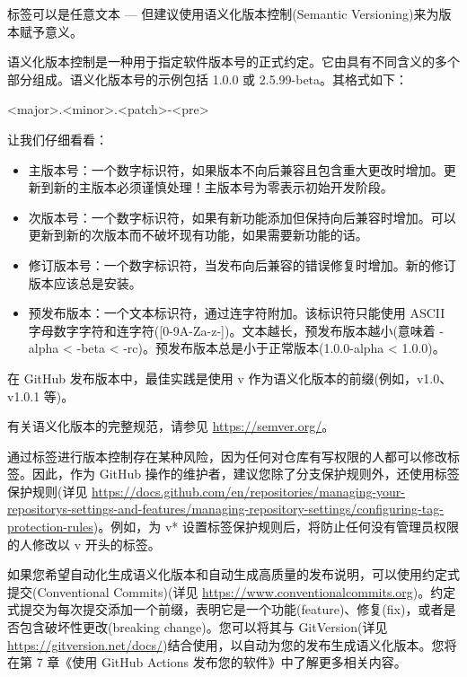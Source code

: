 标签可以是任意文本 --- 但建议使用语义化版本控制(Semantic Versioning)来为版本赋予意义。

语义化版本控制是一种用于指定软件版本号的正式约定。它由具有不同含义的多个部分组成。语义化版本号的示例包括 1.0.0 或 2.5.99-beta。其格式如下：

\begin{shell}
<major>.<minor>.<patch>-<pre>
\end{shell}

让我们仔细看看：

\begin{itemize}
\item 
主版本号：一个数字标识符，如果版本不向后兼容且包含重大更改时增加。更新到新的主版本必须谨慎处理！主版本号为零表示初始开发阶段。

\item 
次版本号：一个数字标识符，如果有新功能添加但保持向后兼容时增加。可以更新到新的次版本而不破坏现有功能，如果需要新功能的话。

\item 
修订版本号：一个数字标识符，当发布向后兼容的错误修复时增加。新的修订版本应该总是安装。

\item 
预发布版本：一个文本标识符，通过连字符附加。该标识符只能使用 ASCII 字母数字字符和连字符([0-9A-Za-z-])。文本越长，预发布版本越小(意味着 -alpha < -beta < -rc)。预发布版本总是小于正常版本(1.0.0-alpha < 1.0.0)。
\end{itemize}


在 GitHub 发布版本中，最佳实践是使用 v 作为语义化版本的前缀(例如，v1.0、v1.0.1 等)。

有关语义化版本的完整规范，请参见 \url{https://semver.org/}。


通过标签进行版本控制存在某种风险，因为任何对仓库有写权限的人都可以修改标签。因此，作为 GitHub 操作的维护者，建议您除了分支保护规则外，还使用标签保护规则(详见 \url{https://docs.github.com/en/repositories/managing-your-repositorys-settings-and-features/managing-repository-settings/configuring-tag-protection-rules})。例如，为 v* 设置标签保护规则后，将防止任何没有管理员权限的人修改以 v 开头的标签。

如果您希望自动化生成语义化版本和自动生成高质量的发布说明，可以使用约定式提交(Conventional Commits)(详见 \url{https://www.conventionalcommits.org})。约定式提交为每次提交添加一个前缀，表明它是一个功能(feature)、修复(fix)，或者是否包含破坏性更改(breaking change)。您可以将其与 GitVersion(详见 \url{https://gitversion.net/docs/})结合使用，以自动为您的发布生成语义化版本。您将在第 7 章《使用 GitHub Actions 发布您的软件》中了解更多相关内容。